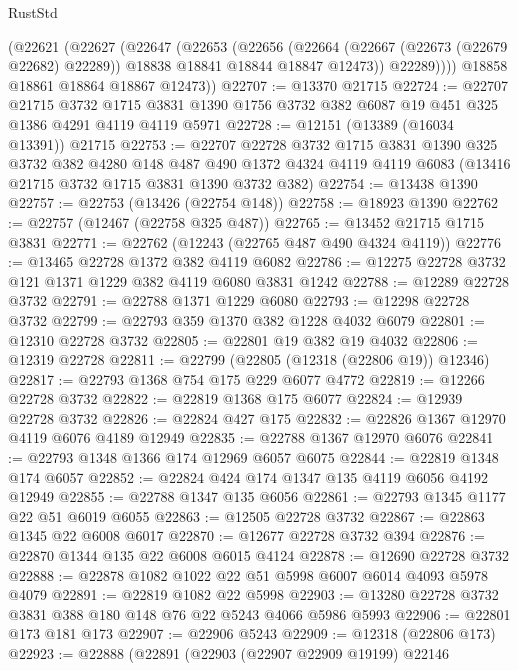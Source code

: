 \begin{lexlean}{RustStd}
\begin{coremodule}
        (@22621
          (@22627
            (@22647
              (@22653
                (@22656
                  (@22664
                    (@22667 (@22673 (@22679 @22682) @22289))
                    @18838
                    @18841
                    @18844
                    @18847
                    @12473))
                @22289))))
        @18858
        @18861
        @18864
        @18867
        @12473))
@22707 := @13370 @21715
@22724 := @22707
    @21715
    @3732
    @1715
    @3831
    @1390
    @1756
    @3732
    @382
    @6087
    @19
    @451
    @325
    @1386
    @4291
    @4119
    @4119
    @5971
@22728 := @12151 (@13389 (@16034 @13391)) @21715
@22753 := @22707
    @22728
    @3732
    @1715
    @3831
    @1390
    @325
    @3732
    @382
    @4280
    @148
    @487
    @490
    @1372
    @4324
    @4119
    @4119
    @6083
    (@13416 @21715 @3732 @1715 @3831 @1390 @3732 @382)
@22754 := @13438 @1390
@22757 := @22753 (@13426 (@22754 @148))
@22758 := @18923 @1390
@22762 := @22757 (@12467 (@22758 @325 @487))
@22765 := @13452 @21715 @1715 @3831
@22771 := @22762 (@12243 (@22765 @487 @490 @4324 @4119))
@22776 := @13465 @22728 @1372 @382 @4119 @6082
@22786 := @12275 @22728 @3732 @121 @1371 @1229 @382 @4119 @6080 @3831 @1242
@22788 := @12289 @22728 @3732
@22791 := @22788 @1371 @1229 @6080
@22793 := @12298 @22728 @3732
@22799 := @22793 @359 @1370 @382 @1228 @4032 @6079
@22801 := @12310 @22728 @3732
@22805 := @22801 @19 @382 @19 @4032
@22806 := @12319 @22728
@22811 := @22799 (@22805 (@12318 (@22806 @19)) @12346)
@22817 := @22793 @1368 @754 @175 @229 @6077 @4772
@22819 := @12266 @22728 @3732
@22822 := @22819 @1368 @175 @6077
@22824 := @12939 @22728 @3732
@22826 := @22824 @427 @175
@22832 := @22826 @1367 @12970 @4119 @6076 @4189 @12949
@22835 := @22788 @1367 @12970 @6076
@22841 := @22793 @1348 @1366 @174 @12969 @6057 @6075
@22844 := @22819 @1348 @174 @6057
@22852 := @22824 @424 @174 @1347 @135 @4119 @6056 @4192 @12949
@22855 := @22788 @1347 @135 @6056
@22861 := @22793 @1345 @1177 @22 @51 @6019 @6055
@22863 := @12505 @22728 @3732
@22867 := @22863 @1345 @22 @6008 @6017
@22870 := @12677 @22728 @3732 @394
@22876 := @22870 @1344 @135 @22 @6008 @6015 @4124
@22878 := @12690 @22728 @3732
@22888 := @22878 @1082 @1022 @22 @51 @5998 @6007 @6014 @4093 @5978 @4079
@22891 := @22819 @1082 @22 @5998
@22903 := @13280 @22728 @3732 @3831 @388 @180 @148 @76 @22 @5243 @4066 @5986 @5993
@22906 := @22801 @173 @181 @173
@22907 := @22906 @5243
@22909 := @12318 (@22806 @173)
@22923 := @22888
    (@22891
      (@22903
        (@22907 @22909 @19199)
        @22146

\end{coremodule}
\end{lexlean}

